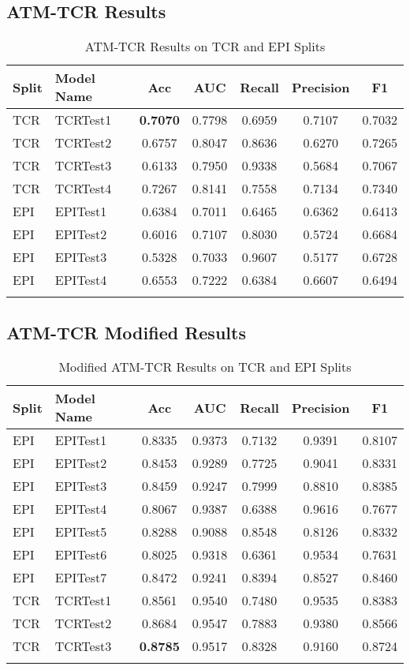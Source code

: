 \documentclass[11pt,a4paper]{article}
\begin{document}
\subsection{ATM-TCR Results}
\begin{longtable}{|l|l|c|c|c|c|c|}
\hline
\textbf{Split} & \textbf{Model Name} & \textbf{Acc} & \textbf{AUC} & \textbf{Recall} & \textbf{Precision} & \textbf{F1} \\ \hline
TCR & TCRTest1 & \textbf{0.7070} & 0.7798 & 0.6959 & 0.7107 & 0.7032 \\ \hline
TCR & TCRTest2 & 0.6757 & 0.8047 & 0.8636 & 0.6270 & 0.7265 \\ \hline
TCR & TCRTest3 & 0.6133 & 0.7950 & 0.9338 & 0.5684 & 0.7067 \\ \hline
TCR & TCRTest4 & 0.7267 & 0.8141 & 0.7558 & 0.7134 & 0.7340 \\ \hline
EPI & EPITest1 & 0.6384 & 0.7011 & 0.6465 & 0.6362 & 0.6413 \\ \hline
EPI & EPITest2 & 0.6016 & 0.7107 & 0.8030 & 0.5724 & 0.6684 \\ \hline
EPI & EPITest3 & 0.5328 & 0.7033 & 0.9607 & 0.5177 & 0.6728 \\ \hline
EPI & EPITest4 & 0.6553 & 0.7222 & 0.6384 & 0.6607 & 0.6494 \\ \hline
\caption{ATM-TCR Results on TCR and EPI Splits}
\label{table:atm-tcr}
\end{longtable}

\subsection{ATM-TCR Modified Results}
\begin{longtable}{|l|l|c|c|c|c|c|}
\hline
\textbf{Split} & \textbf{Model Name} & \textbf{Acc} & \textbf{AUC} & \textbf{Recall} & \textbf{Precision} & \textbf{F1} \\ \hline
EPI & EPITest1 & 0.8335 & 0.9373 & 0.7132 & 0.9391 & 0.8107 \\ \hline
EPI & EPITest2 & 0.8453 & 0.9289 & 0.7725 & 0.9041 & 0.8331 \\ \hline
EPI & EPITest3 & 0.8459 & 0.9247 & 0.7999 & 0.8810 & 0.8385 \\ \hline
EPI & EPITest4 & 0.8067 & 0.9387 & 0.6388 & 0.9616 & 0.7677 \\ \hline
EPI & EPITest5 & 0.8288 & 0.9088 & 0.8548 & 0.8126 & 0.8332 \\ \hline
EPI & EPITest6 & 0.8025 & 0.9318 & 0.6361 & 0.9534 & 0.7631 \\ \hline
EPI & EPITest7 & 0.8472 & 0.9241 & 0.8394 & 0.8527 & 0.8460 \\ \hline
TCR & TCRTest1 & 0.8561 & 0.9540 & 0.7480 & 0.9535 & 0.8383 \\ \hline
TCR & TCRTest2 & 0.8684 & 0.9547 & 0.7883 & 0.9380 & 0.8566 \\ \hline
TCR & TCRTest3 & \textbf{0.8785} & 0.9517 & 0.8328 & 0.9160 & 0.8724 \\ \hline
\caption{Modified ATM-TCR Results on TCR and EPI Splits}
\label{table:atm-tcr}
\end{longtable}
\end{document}
